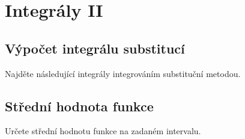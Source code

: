 \konec





\stranka
\section{Integrály II}



\stranka
\subsection{Výpočet integrálu substitucí} Najděte následující integrály integrováním substituční metodou.


\stranka

\subsection{Střední hodnota funkce}
Určete střední hodnotu funkce na zadaném intervalu.

